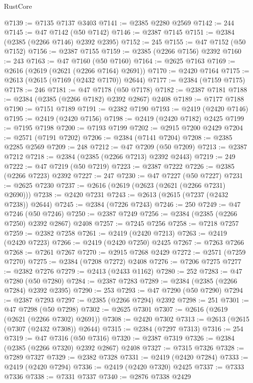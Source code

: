 \begin{lexlean}{RustCore}
\begin{coremodule}
@7139 := @7135 @7137 @3403
@7141 := @2385 @2280 @2569
@7142 := 244
@7145 := @47 @7142 (@50 @7142)
@7146 := @2387 @7145
@7151 := @2384 (@2385 (@2266 @7146) @2392 @2395)
@7152 := 245
@7155 := @47 @7152 (@50 @7152)
@7156 := @2387 @7155
@7159 := @2385 (@2266 @7156) @2392
@7160 := 243
@7163 := @47 @7160 (@50 @7160)
@7164 := @2625 @7163
@7169 := @2616 (@2619 (@2621 (@2266 @7164) @2691))
@7170 := @2420 @7164
@7175 := @2613 (@2615 (@7169 (@2432 @7170)) @2644)
@7177 := @2384 (@7159 @7175)
@7178 := 246
@7181 := @47 @7178 (@50 @7178)
@7182 := @2387 @7181
@7188 := @2384 (@2385 (@2266 @7182) @2392 @2867) @2408
@7189 := @7177 @7188
@7190 := @7151 @7189
@7191 := @2382 @7190
@7193 := @2419 (@2420 @7146)
@7195 := @2419 (@2420 @7156)
@7198 := @2419 (@2420 @7182) @2425
@7199 := @7195 @7198
@7200 := @7193 @7199
@7202 := @2915 @7200 @2429
@7204 := @2571 (@7191 @7202)
@7206 := @2384 (@7141 @7204)
@7208 := @2385 @2285 @2569
@7209 := 248
@7212 := @47 @7209 (@50 @7209)
@7213 := @2387 @7212
@7218 := @2384 (@2385 (@2266 @7213) @2392 @2443)
@7219 := 249
@7222 := @47 @7219 (@50 @7219)
@7223 := @2387 @7222
@7226 := @2385 (@2266 @7223) @2392
@7227 := 247
@7230 := @47 @7227 (@50 @7227)
@7231 := @2625 @7230
@7237 := @2616 (@2619 (@2623 (@2621 (@2266 @7231) @2690)))
@7238 := @2420 @7231
@7243 := @2613 (@2615 (@7237 (@2432 @7238)) @2644)
@7245 := @2384 (@7226 @7243)
@7246 := 250
@7249 := @47 @7246 (@50 @7246)
@7250 := @2387 @7249
@7256 := @2384 (@2385 (@2266 @7250) @2392 @2867) @2408
@7257 := @7245 @7256
@7258 := @7218 @7257
@7259 := @2382 @7258
@7261 := @2419 (@2420 @7213)
@7263 := @2419 (@2420 @7223)
@7266 := @2419 (@2420 @7250) @2425
@7267 := @7263 @7266
@7268 := @7261 @7267
@7270 := @2915 @7268 @2429
@7272 := @2571 (@7259 @7270)
@7275 := @2384 (@7208 @7272) @2408
@7276 := @7206 @7275
@7277 := @2382 @7276
@7279 := @2413 (@2433 @1162)
@7280 := 252
@7283 := @47 @7280 (@50 @7280)
@7284 := @2387 @7283
@7289 := @2384 (@2385 (@2266 @7284) @2392 @2395)
@7290 := 253
@7293 := @47 @7290 (@50 @7290)
@7294 := @2387 @7293
@7297 := @2385 (@2266 @7294) @2392
@7298 := 251
@7301 := @47 @7298 (@50 @7298)
@7302 := @2625 @7301
@7307 := @2616 (@2619 (@2621 (@2266 @7302) @2691))
@7308 := @2420 @7302
@7313 := @2613 (@2615 (@7307 (@2432 @7308)) @2644)
@7315 := @2384 (@7297 @7313)
@7316 := 254
@7319 := @47 @7316 (@50 @7316)
@7320 := @2387 @7319
@7326 := @2384 (@2385 (@2266 @7320) @2392 @2867) @2408
@7327 := @7315 @7326
@7328 := @7289 @7327
@7329 := @2382 @7328
@7331 := @2419 (@2420 @7284)
@7333 := @2419 (@2420 @7294)
@7336 := @2419 (@2420 @7320) @2425
@7337 := @7333 @7336
@7338 := @7331 @7337
@7340 := @2876 @7338 @2429

\end{coremodule}
\end{lexlean}
